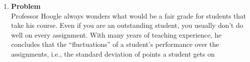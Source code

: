 \documentclass[12pt]{article}
\newenvironment{Ex}{\textbf{Problem}\vspace{.75em}\\}{}
\begin{document}
\begin{enumerate}
\begin{Ex}
\begin{solution}
\begin{enumerate}
\begin{table}[H]
\begin{tabularx}{\linewidth}{XX}
\begin{equation}
\begin{aligned}
              \end{aligned}
            \end{equation}
            &
            \begin{equation}
              \label{eq:5a-var-x}
              \begin{aligned}
                \text{Var}(X) &= \text{Var}(n X_1) \\
                \implies \sigma_{X_i}^2 &= 62400 \\
              \end{aligned}
            \end{equation}
          \end{tabularx}
        \end{table}

        The confidence interval then becomes
        \begin{equation}
          \label{eq:5a-presol}
            \left[260 - 1.96\sqrt{\frac{\sigma_X^2}{n}}, 260 +
            1.96\sqrt{\frac{\sigma_X^2}{n}}\right]
        \end{equation}
        Which makes our interval
        \begin{equation}
          \label{eq:5a-sol}
          \implies [238.104, 281.896]
        \end{equation}
      \item Repeating the above with the altered probabilities yeilds
        \begin{equation}
          \label{eq:5b-presol}
            \left[25 - 1.96\sqrt{\frac{\sigma_X^2}{n}}, 25 +
            1.96\sqrt{\frac{\sigma_X^2}{n}}\right]
        \end{equation}
        Which makes our interval
        \begin{equation}
          \label{eq:5b-sol}
          \implies [15.4481, 35.5519]
        \end{equation}
      \end{enumerate}
    \end{solution}
  \end{Ex}
\item
  \begin{Ex}
    Professor Hoogle always wonders what would be a fair grade for
    students that take his course. Even if you are an outstanding
    student, you usually don’t do well on every assignment. With many
    years of teaching experience, he concludes that the
    ``fluctuations'' of a student’s performance over the assignments,
    i.e., the standard deviation of points a student gets on

\end{Ex}
\end{enumerate}
\end{document}
